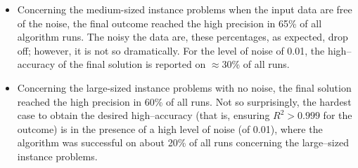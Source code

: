 \documentclass[a4paper,12pt]{elsarticle}
\begin{document}
\begin{itemize}
	\item Concerning  the medium-sized instance problems when the input data are free of the noise,   the final outcome reached the high precision in 65\% of all algorithm runs.    The noisy the data are, these percentages, as expected, drop off; however, it is not so dramatically. For the level of noise of 0.01, the high--accuracy of the final solution is reported on $\approx$30\% of all runs.
	
	\item Concerning  the large-sized instance problems with no noise, the  final solution reached the high precision in 60\% of all runs. Not so surprisingly, the hardest case to obtain the desired high--accuracy (that is, ensuring $R^2> 0.999$ for  the  outcome) is in the presence of a high level of noise (of 0.01), where the algorithm was successful on about 20\% of all runs concerning the large--sized instance problems. 
	
\end{itemize}

\begin{center}
	\label{fig:compExact_noise_size}
\end{center}
\end{document}
